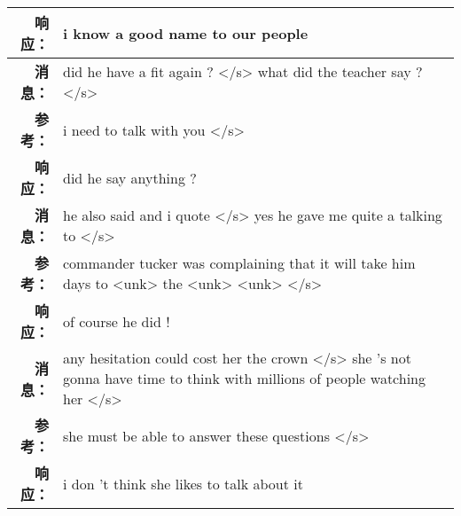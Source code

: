 \begin{tabularx}{\textwidth}{@{}rX@{}}
\textbf{响应：}&i know a good name to our people\\%
\midrule%
\textbf{消息：}&did he have a fit again ? </s> what did the teacher say ?  </s>\\%
\textbf{参考：}& i need to talk with you </s>\\%
\textbf{响应：}&did he say anything ?\\%
\midrule%
\textbf{消息：}&he also said and i quote </s> yes he gave me quite a talking to  </s>\\%
\textbf{参考：}& commander tucker was complaining that it will take him days to <unk> the <unk> <unk> </s>\\%
\textbf{响应：}&of course he did !\\%
\midrule%
\textbf{消息：}&any hesitation could cost her the crown </s> she 's not gonna have time to think with millions of people watching her  </s>\\%
\textbf{参考：}& she must be able to answer these questions </s>\\%
\textbf{响应：}&i don 't think she likes to talk about it\\%
\midrule\bottomrule%
%
\end{tabularx}